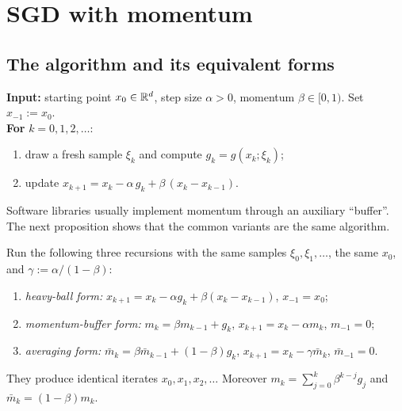 \section{SGD with momentum}\label{sec:momentum}

\subsection{The algorithm and its equivalent forms}\label{sec:forms}

\begin{tcolorbox}[keybox,title={\textbf{Algorithm 1: SGD with momentum (heavy-ball form)}},
  colbacktitle=RoyalBlue!60!black]
\textbf{Input:} starting point $x_0\in\mathbb{R}^d$, step size $\alpha>0$, momentum $\beta\in[0,1)$.
Set $x_{-1}:=x_0$.\\
\textbf{For} $k=0,1,2,\dots$:
\begin{enumerate}[label=\arabic*.,leftmargin=2.2em,topsep=2pt]
  \item draw a fresh sample $\xi_k$ and compute $g_k=g(x_k;\xi_k)$;
  \item update $x_{k+1}=x_k-\alpha\,g_k+\beta\,(x_k-x_{k-1})$.
\end{enumerate}
\end{tcolorbox}

Software libraries usually implement momentum through an auxiliary ``buffer''. The next
proposition shows that the common variants are the same algorithm.

\begin{proposition}\label{prop:forms}
Run the following three recursions with the same samples $\xi_0,\xi_1,\dots$, the same
$x_0$, and $\gamma:=\alpha/(1-\beta)$:
\begin{enumerate}[label=\textup{(\roman*)}]
\item \emph{heavy-ball form:} $x_{k+1}=x_k-\alpha g_k+\beta(x_k-x_{k-1})$, \quad $x_{-1}=x_0$;
\item \emph{momentum-buffer form:} $m_k=\beta m_{k-1}+g_k$, \quad $x_{k+1}=x_k-\alpha m_k$,
      \quad $m_{-1}=0$;
\item \emph{averaging form:} $\bar m_k=\beta\bar m_{k-1}+(1-\beta)g_k$, \quad
      $x_{k+1}=x_k-\gamma\bar m_k$, \quad $\bar m_{-1}=0$.
\end{enumerate}
They produce identical iterates $x_0,x_1,x_2,\dots$ Moreover
$m_k=\sum_{j=0}^k\beta^{k-j}g_j$ and $\bar m_k=(1-\beta)m_k$.
\end{proposition}

